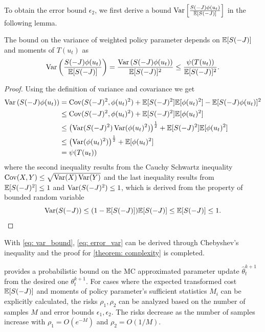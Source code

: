 \documentclass[twoside,11pt]{article}
\begin{document}
To obtain the error bound $\epsilon_2$, we first derive a bound $\operatorname{Var}\left[\frac{S(-J)\phi(u_t)}{\mathbb{E}[S(-J)]}\right]$ in the following lemma.
\begin{lemma}\label{lemma: var}
The bound on the variance of weighted policy parameter depends on $\mathbb{E}[S(-J)]$ and moments of $T(u_t)$ as
\begin{equation} \label{eq: var_bound}
\operatorname{Var}\left(\frac{S(-J)\phi(u_t)}{\mathbb{E}[S(-J)]}\right)=\frac{\operatorname{Var}\left(S(-J)\phi(u_t)\right)}{\mathbb{E}[S(-J)]^2} \leq \frac{\psi(T(u_t))}{\mathbb{E}[S(-J)]^2}.
\end{equation}
\end{lemma}
\begin{proof}
Using the definition of variance and covariance we get
\begin{align*}
\operatorname{Var}\left(S(-J)\phi(u_t)\right)&=\operatorname{Cov}(S(-J)^2,\phi(u_t)^2) + \mathbb{E}[S(-J)^2]\mathbb{E}[\phi(u_t)^2]-\mathbb{E}[S(-J)\phi(u_t)]^2\\
&\leq \operatorname{Cov}(S(-J)^2,\phi(u_t)^2) + \mathbb{E}[S(-J)^2]\mathbb{E}[\phi(u_t)^2]\\
&\leq \left(\operatorname{Var}(S(-J)^2)\operatorname{Var}(\phi(u_t)^2)\right)^{\frac{1}{2}} + \mathbb{E}[S(-J)^2]\mathbb{E}[\phi(u_t)^2]\\
&\leq \left(\operatorname{Var}(\phi(u_t)^2)\right)^{\frac{1}{2}} + \mathbb{E}[\phi(u_t)^2]\\
&= \psi(T(u_t))
\end{align*}
where the second inequality results from the Cauchy Schwartz inequality $\operatorname{Cov}(X,Y)\leq\sqrt{\operatorname{Var}(X)\operatorname{Var}(Y)}$ and the last inequality results from $\mathbb{E}[S(-J)^2]\leq 1$ and $\operatorname{Var}(S(-J)^2)\leq 1$, which is derived from the property of bounded random variable
\begin{equation*}
\operatorname{Var}(S(-J))\leq (1-\mathbb{E}[S(-J)])\mathbb{E}[S(-J)]\leq \mathbb{E}[S(-J)]\leq 1.
\end{equation*}
\end{proof}
With \eqref{eq: var_bound}, \cref{eq: error_var} can be derived through Chebyshev's inequality and the proof for \cref{theorem: complexity} is completed.

 provides a probabilistic bound on the \ac{MC} approximated parameter update $\hat{\theta} ^{k+1}_t$ from the desired one $\theta^{k+1}_t$. For cases where the expected transformed cost $\mathbb{E}[S(-J)]$ and moments of policy parameter's sufficient statistics $M_i$ can be explicitly calculated, the risks $\rho_1, \rho_2$ can be analyzed based on the number of samples $M$ and error bounds $\epsilon_1,\epsilon_2$. The risks decrease as the number of samples increase with $\rho_1=O(e^{-M})$ and $\rho_2=O(1/M)$.
\end{document}
